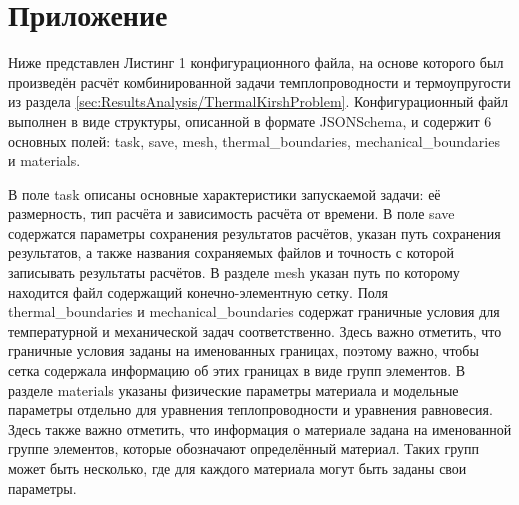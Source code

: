 \chapter*{Приложение} 

Ниже представлен Листинг 1 конфигурационного файла, на основе которого был произведён расчёт комбинированной задачи темплопроводности и термоупругости из раздела \ref{sec:ResultsAnalysis/ThermalKirshProblem}. Конфигурационный файл выполнен в виде структуры, описанной в формате JSONSchema, и содержит 6 основных полей: task, save, mesh, thermal\_boundaries, mechanical\_boundaries и materials.

В поле task описаны основные характеристики запускаемой задачи: её размерность, тип расчёта и зависимость расчёта от времени. В поле save содержатся параметры сохранения результатов расчётов, указан путь сохранения результатов, а также названия сохраняемых файлов и точность с которой записывать результаты расчётов. В разделе mesh указан путь по которому находится файл содержащий конечно-элементную сетку. Поля thermal\_boundaries и mechanical\_boundaries содержат граничные условия для температурной и механической задач соответственно. Здесь важно отметить, что граничные условия заданы на именованных границах, поэтому важно, чтобы сетка содержала информацию об этих границах в виде групп элементов. В разделе materials указаны физические параметры материала и модельные параметры отдельно для уравнения теплопроводности и уравнения равновесия. Здесь также важно отметить, что информация о материале задана на именованной группе элементов, которые обозначают определённый материал. Таких групп может быть несколько, где для каждого материала могут быть заданы свои параметры.

\begingroup
\captiondelim{ } %

\endgroup
